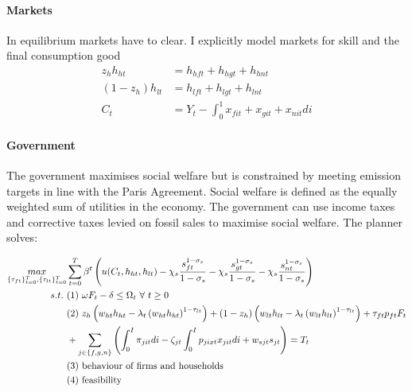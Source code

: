 \paragraph{Markets}
In equilibrium markets have to clear. I explicitly model markets for skill and the final consumption good
\begin{align}
z_h h_{ht}&=h_{hft}+h_{hgt}+h_{hnt}\\
(1-z_h) h_{lt}&=h_{lft}+h_{lgt}+h_{lnt}\\
C_t&=Y_t-\int_{0}^{1}x_{fit}+x_{git}+x_{nit}di
\end{align}
\paragraph{Government}

The government maximises social welfare but is constrained by meeting emission targets in line with the Paris Agreement. Social welfare is defined as the equally weighted sum of utilities in the economy. The government can use income taxes and corrective taxes levied on fossil sales to maximise social welfare. The planner solves:

\begin{align*}
\underset{\{\tau_{ft}\}_{t=0}^{T},\{\tau_{lt}\}_{t=0}^{T}}{max}&\sum_{t=0}^{T}\beta^t\left( u(C_{t}, h_{ht}, h_{lt})-\chi_s\frac{s_{ft}^{1-\sigma_s}}{{1-\sigma_s}}-\chi_s\frac{s_{gt}^{1-\sigma_s}}{{1-\sigma_s}}-\chi_s\frac{s_{nt}^{1-\sigma_s}}{{1-\sigma_s}}\right) \\
s.t.\ %
& (1)\ \omega F_{t} -\delta \leq \Omega_t \  \forall \ t\geq 0 \\ %
& (2)\ z_h\left(w_{ht}h_{ht}-\lambda_t \left(w_{ht}h_{ht}\right)^{1-\tau_{lt}}\right)+(1-z_h)\left(w_{lt}h_{lt}-\lambda_t\left(w_{lt}h_{lt}\right)^{1-\tau_{lt}}\right) +\tau_{ft}p_{ft}F_{t} \\ 
& +\sum_{j\in\{f,g,n\}}\left(\int_{0}^{I}\pi_{jit}di-\zeta_{jt}\int_{0}^{I}p_{jixt}x_{jit}di+w_{sjt}s_{jt}\right)= T_t\hspace{3mm}\\
& (3)\ \text{behaviour of firms and households}\\
& (4)\ \text{feasibility}
\end{align*}

